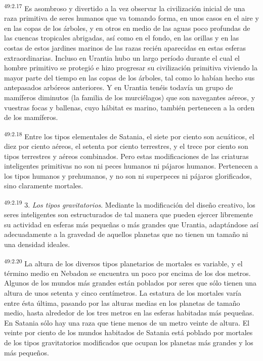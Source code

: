 \par
\textsuperscript{49:2.17} Es asombroso y divertido a la vez observar la civilización inicial de una raza primitiva de seres humanos que va tomando forma, en unos casos en el aire y en las copas de los árboles, y en otros en medio de las aguas poco profundas de las cuencas tropicales abrigadas, así como en el fondo, en las orillas y en las costas de estos jardines marinos de las razas recién aparecidas en estas esferas extraordinarias. Incluso en Urantia hubo un largo período durante el cual el hombre primitivo se protegió e hizo progresar su civilización primitiva viviendo la mayor parte del tiempo en las copas de los árboles, tal como lo habían hecho sus antepasados arbóreos anteriores. Y en Urantia tenéis todavía un grupo de mamíferos diminutos (la familia de los murciélagos) que son navegantes aéreos, y vuestras focas y ballenas, cuyo hábitat es marino, también pertenecen a la orden de los mamíferos.

\par
\textsuperscript{49:2.18} Entre los tipos elementales de Satania, el siete por ciento son acuáticos, el diez por ciento aéreos, el setenta por ciento terrestres, y el trece por ciento son tipos terrestres y aéreos combinados. Pero estas modificaciones de las criaturas inteligentes primitivas no son ni peces humanos ni pájaros humanos. Pertenecen a los tipos humanos y prehumanos, y no son ni superpeces ni pájaros glorificados, sino claramente mortales.

\par
\textsuperscript{49:2.19} 3. \textit{Los tipos gravitatorios}. Mediante la modificación del diseño creativo, los seres inteligentes son estructurados de tal manera que pueden ejercer libremente su actividad en esferas más pequeñas o más grandes que Urantia, adaptándose así adecuadamente a la gravedad de aquellos planetas que no tienen un tamaño ni una densidad ideales.

\par
\textsuperscript{49:2.20} La altura de los diversos tipos planetarios de mortales es variable, y el término medio en Nebadon se encuentra un poco por encima de los dos metros. Algunos de los mundos más grandes están poblados por seres que sólo tienen una altura de unos setenta y cinco centímetros. La estatura de los mortales varía entre ésta última, pasando por las alturas medias en los planetas de tamaño medio, hasta alrededor de los tres metros en las esferas habitadas más pequeñas. En Satania sólo hay una raza que tiene menos de un metro veinte de altura. El veinte por ciento de los mundos habitados de Satania está poblado por mortales de los tipos gravitatorios modificados que ocupan los planetas más grandes y los más pequeños.

